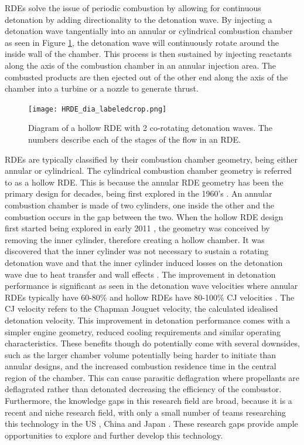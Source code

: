 \documentclass{article}
\begin{document}
RDEs solve the issue of periodic combustion by allowing for continuous detonation by adding directionality to the detonation wave. By injecting a detonation wave tangentially into an annular or cylindrical combustion chamber as seen in Figure \ref{Fig.1}, the detonation wave will continuously rotate around the inside wall of the chamber. This process is then sustained by injecting reactants along the axis of the combustion chamber in an annular injection area. The combusted products are then ejected out of the other end along the axis of the chamber into a turbine or a nozzle to generate thrust. 
\par

\begin{figure}
\centering
\texttt{[image: HRDE\_dia\_labeledcrop.png]}
\caption{Diagram of a hollow RDE with 2 co-rotating detonation waves. The numbers describe each of the stages of the flow in an RDE.}\label{Fig.1}
\end{figure}

RDEs are typically classified by their combustion chamber geometry, being either annular or cylindrical. The cylindrical combustion chamber geometry is referred to as a hollow RDE. This is because the annular RDE geometry has been the primary design for decades, being first explored in the 1960’s \cite{Nicholls1966}. An annular combustion chamber is made of two cylinders, one inside the other and the combustion occurs in the gap between the two. When the hollow RDE design first started being explored in early 2011 \cite{Shao2011}, the geometry was conceived by removing the inner cylinder, therefore creating a hollow chamber. It was discovered that the inner cylinder was not necessary to sustain a rotating detonation wave and that the inner cylinder induced losses on the detonation wave due to heat transfer and wall effects \cite{Shao2011}. The improvement in detonation performance is significant as seen in the detonation wave velocities where annular RDEs typically have 60-80\% and hollow RDEs have 80-100\% CJ velocities \cite{Liu2021}. The CJ velocity refers to the Chapman Jouguet velocity, the calculated idealised detonation velocity. This improvement in detonation performance comes with a simpler engine geometry, reduced cooling requirements and similar operating characteristics. These benefits though do potentially come with several downsides, such as the larger chamber volume potentially being harder to initiate than annular designs, and the increased combustion residence time in the central region of the chamber. This can cause parasitic deflagration where propellants are deflagrated rather than detonated decreasing the efficiency of the combustor. Furthermore, the knowledge gaps in this research field are broad, because it is a recent and niche research field, with only a small number of teams researching this technology in the US \cite{Wiggins2023}, China \cite{Xue2022} and Japan \cite{Nakata2022}. These research gaps provide ample opportunities to explore and further develop this technology.
\par
\end{document}
